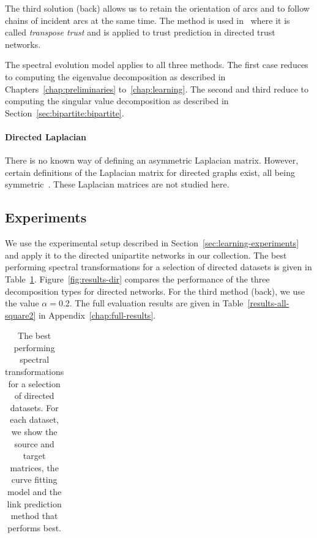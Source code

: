 \documentclass[11pt,a4paper]{book}
\begin{document}
The third solution (\textrm{back}) allows us to retain the orientation of
arcs and to follow 
chains of incident arcs at the same time.  The method is used
in~\cite{b325} where it is called \emph{transpose trust} and is applied to
trust prediction in directed trust networks. 

The spectral evolution model applies to all three methods.  The first
case reduces to computing the eigenvalue decomposition as described in
Chapters~\ref{chap:preliminaries} to~\ref{chap:learning}. 
The second and third reduce to computing the singular value
decomposition as described in Section~\ref{sec:bipartite:bipartite}. 

\paragraph{Directed Laplacian}
There is no known way of defining an asymmetric Laplacian matrix.
However, certain definitions of the Laplacian matrix for directed graphs
exist, all being symmetric~\cite{b264,b193,b634}.  
These Laplacian matrices are not studied here. 

\subsection{Experiments}
We use the experimental setup described in
Section~\ref{sec:learning-experiments} and apply 
it to the directed unipartite networks in our collection. 
The best performing spectral
transformations for a selection of directed datasets is given in
Table~\ref{tab:bestcurve-directed}. 
Figure~\ref{fig:results-dir} compares the performance of the three
decomposition types for directed networks.  
For the third method
(\textrm{back}), we use the value $\alpha = 0.2$. 
The full evaluation results are given in Table~\ref{results-all-square2} in
Appendix~\ref{chap:full-results}. 

\begin{table}[h!]
  \centering
  \caption{
    The best performing spectral transformations for a selection of
    directed datasets.  For each dataset, we show the source and target
    matrices, the curve fitting model and the link prediction method
    that performs best.
  }
  \begin{tabular}{ lllll }
    \toprule
    
    \midrule
    
    \bottomrule
  \end{tabular}			
  \label{tab:bestcurve-directed}
\end{table}
\end{document}
